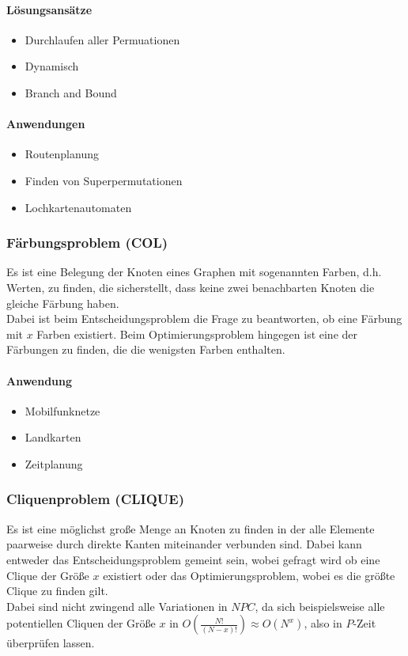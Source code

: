\documentclass{article}
\begin{document}
\paragraph*{Lösungsansätze}
\begin{itemize}
    \item Durchlaufen aller Permuationen
    \item Dynamisch
    \item Branch and Bound
\end{itemize}
\paragraph*{Anwendungen}
\begin{itemize}
    \item Routenplanung
    \item Finden von Superpermutationen
    \item Lochkartenautomaten
\end{itemize}
\subsubsection{Färbungsproblem (COL)}
Es ist eine Belegung der Knoten eines Graphen mit sogenannten Farben, d.h. Werten, zu finden, die sicherstellt, dass keine zwei benachbarten Knoten die gleiche Färbung haben. \\
\indent Dabei ist beim Entscheidungsproblem die Frage zu beantworten, ob eine Färbung mit $x$ Farben existiert. Beim Optimierungsproblem hingegen ist eine der Färbungen zu finden, die die wenigsten Farben enthalten.
\paragraph*{Anwendung}
\begin{itemize}
    \item Mobilfunknetze
    \item Landkarten
    \item Zeitplanung
\end{itemize}
\subsubsection{Cliquenproblem (CLIQUE)}
Es ist eine möglichst große Menge an Knoten zu finden in der alle Elemente paarweise durch direkte Kanten miteinander verbunden sind. Dabei kann entweder das Entscheidungsproblem gemeint sein, wobei gefragt wird ob eine Clique der Größe $x$ existiert oder das Optimierungsproblem, wobei es die größte Clique zu finden gilt.\\
\indent Dabei sind nicht zwingend alle Variationen in $NPC$, da sich beispielsweise alle potentiellen Cliquen der Größe $x$ in $O(\frac{N!}{(N-x)!})\approx O(N^x)$, also in $P$-Zeit überprüfen lassen.
\end{document}

